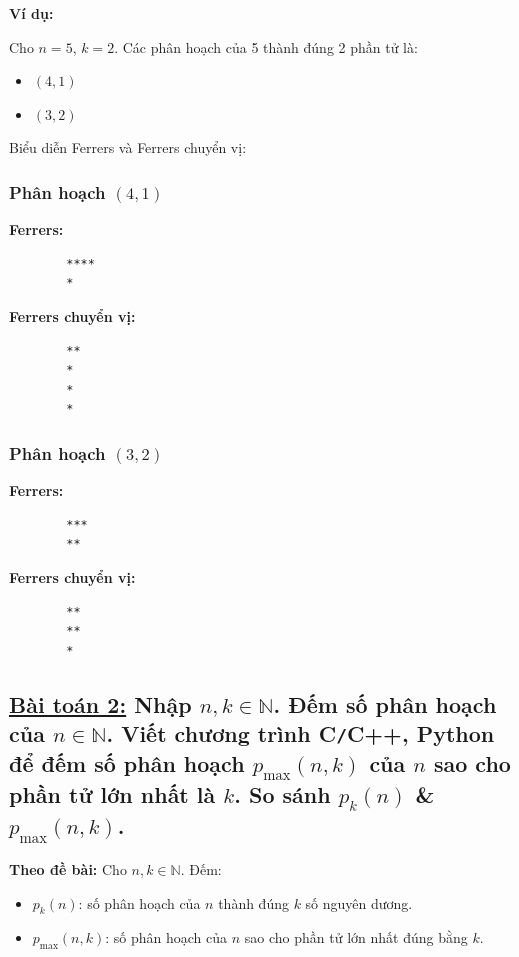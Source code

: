 \documentclass{article}
\begin{document}
	\textbf{Ví dụ:}
	
	Cho $n = 5$, $k = 2$. Các phân hoạch của 5 thành đúng 2 phần tử là:
	
	\begin{itemize}
		\item $(4,1)$
		\item $(3,2)$
	\end{itemize}
	
	Biểu diễn Ferrers và Ferrers chuyển vị:
	
	\subsubsection*{Phân hoạch $(4,1)$}
	
	\textbf{Ferrers:}
	\begin{Verbatim}
		****
		*
	\end{Verbatim}
	
	\textbf{Ferrers chuyển vị:}
	\begin{Verbatim}
		**
		*
		*
		*
	\end{Verbatim}
	
	\subsubsection*{Phân hoạch $(3,2)$}
	
	\textbf{Ferrers:}
	\begin{Verbatim}
		***
		**
	\end{Verbatim}
	
	\textbf{Ferrers chuyển vị:}
	\begin{Verbatim}
		**
		**
		*
	\end{Verbatim}
	
	\subsection*{\underline{Bài toán 2:} Nhập $n,k\in\mathbb{N}$. Đếm số phân hoạch của $n\in\mathbb{N}$. Viết chương trình {\sf C{\tt/}C++, Python} để đếm số phân hoạch $p_{\max}(n,k)$ của $n$ sao cho phần tử lớn nhất là $k$. So sánh $p_k(n)$ \& $p_{\max}(n,k)$.
	}
	
	\textbf{Theo đề bài:} Cho $n, k \in \mathbb{N}$. Đếm:
	\begin{itemize}
		\item $p_k(n)$: số phân hoạch của $n$ thành đúng $k$ số nguyên dương.
		\item $p_{\max}(n, k)$: số phân hoạch của $n$ sao cho phần tử lớn nhất đúng bằng $k$.
	\end{itemize}
	
\end{document}
